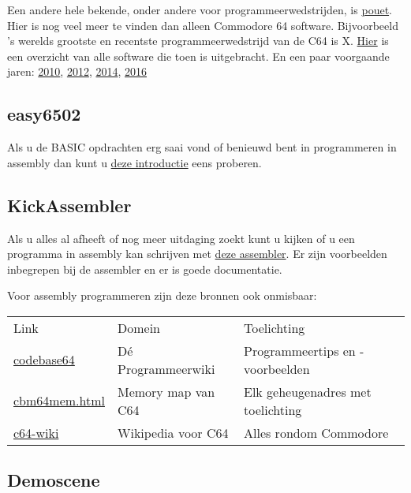 \documentclass{article}
\begin{document}
Een andere hele bekende, onder andere voor programmeerwedstrijden, is \href{https://www.pouet.net}{pouet}.
Hier is nog veel meer te vinden dan alleen Commodore 64 software.
Bijvoorbeeld 's werelds grootste en recentste programmeerwedstrijd van de C64 is X.
\href{https://www.pouet.net/party.php?which=50&when=2018}{Hier} is een overzicht van alle software die toen is uitgebracht.
En een paar voorgaande jaren: \href{https://www.pouet.net/party.php?which=50&when=2010}{2010}, \href{https://www.pouet.net/party.php?which=50&when=2012}{2012}, \href{https://www.pouet.net/party.php?which=50&when=2014}{2014}, \href{https://www.pouet.net/party.php?which=50&when=2016}{2016}

\subsection{easy6502}

Als u de BASIC opdrachten erg saai vond of benieuwd bent in programmeren in assembly dan kunt u \href{https://skilldrick.github.io/easy6502/}{deze introductie} eens proberen.

\subsection{KickAssembler}

Als u alles al afheeft of nog meer uitdaging zoekt kunt u kijken of u een programma in assembly kan schrijven met \href{http://theweb.dk/KickAssembler/Main.html#frontpage}{deze assembler}.
Er zijn voorbeelden inbegrepen bij de assembler en er is goede documentatie.

Voor assembly programmeren zijn deze bronnen ook onmisbaar:

\begin{tabular}{l|l|l}
Link & Domein & Toelichting \\
\href{http://codebase64.org}{codebase64} & D\'e Programmeerwiki & Programmeertips en -voorbeelden \\
\href{http://sta.c64.org/cbm64mem.html}{cbm64mem.html} & Memory map van C64 & Elk geheugenadres met toelichting \\
\href{https://www.c64-wiki.com}{c64-wiki} & Wikipedia voor C64 & Alles rondom Commodore \\
\end{tabular}

\subsection{Demoscene}
\end{document}
